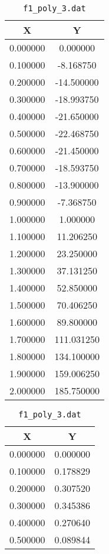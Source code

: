\documentclass[a4paper, fleqn]{report}
\begin{document}
\begin{table}[h!]
\centering
\begin{subtable}{0.45\textwidth}
\centering
\begin{tabular}{|c|c|}
\hline
X & Y \\ \hline
0.000000 & 0.000000 \\ \hline
0.100000 & -8.168750 \\ \hline
0.200000 & -14.500000 \\ \hline
0.300000 & -18.993750 \\ \hline
0.400000 & -21.650000 \\ \hline
0.500000 & -22.468750 \\ \hline
0.600000 & -21.450000 \\ \hline
0.700000 & -18.593750 \\ \hline
0.800000 & -13.900000 \\ \hline
0.900000 & -7.368750 \\ \hline 
1.000000 & 1.000000 \\ \hline
1.100000 & 11.206250 \\ \hline
1.200000 & 23.250000 \\ \hline
1.300000 & 37.131250 \\ \hline
1.400000 & 52.850000 \\ \hline
1.500000 & 70.406250 \\ \hline
1.600000 & 89.800000 \\ \hline
1.700000 & 111.031250 \\ \hline
1.800000 & 134.100000 \\ \hline
1.900000 & 159.006250 \\ \hline
2.000000 & 185.750000 \\ \hline
\end{tabular}
\caption{\texttt{f1\_poly\_3.dat}}
\label{tab:table1}
\end{subtable}%
\hspace{0.01\textwidth} %
\begin{subtable}{0.45\textwidth}
\centering
\begin{tabular}{|c|c|}
\hline
X & Y \\ \hline
0.000000 & 0.000000 \\ \hline
0.100000 & 0.178829 \\ \hline
0.200000 & 0.307520 \\ \hline
0.300000 & 0.345386 \\ \hline 
0.400000 & 0.270640 \\ \hline
0.500000 & 0.089844 \\ \hline

\end{tabular}
\end{subtable}
\end{table}
\end{document}
